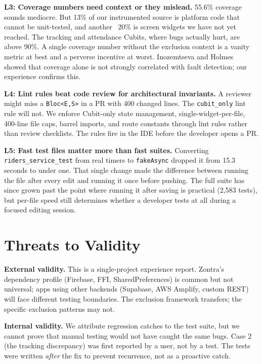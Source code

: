\documentclass[10pt,journal,compsoc]{IEEEtran}
\begin{document}
\textbf{L3: Coverage numbers need context or they mislead.}
55.6\% coverage sounds mediocre. But 13\% of our instrumented source is
platform code that cannot be unit-tested, and another ~20\% is screen
widgets we have not yet reached. The tracking and attendance Cubits,
where bugs actually hurt, are above 90\%. A single coverage number
without the exclusion
context is a vanity metric at best and a perverse incentive at worst.
Inozemtseva and Holmes~\cite{inozemtseva2014coverage} showed that coverage
alone is not strongly correlated with fault detection; our experience
confirms this.

\textbf{L4: Lint rules beat code review for architectural invariants.}
A reviewer might miss a \texttt{Bloc<E,S>} in a PR with 400 changed lines.
The \texttt{cubit\_only} lint rule will not. We enforce Cubit-only state
management, single-widget-per-file, 400-line file caps, barrel imports,
and route constants through lint rules rather than review checklists. The
rules fire in the IDE before the developer opens a PR.

\textbf{L5: Fast test files matter more than fast suites.}
Converting \texttt{riders\_service\_test} from real timers to
\texttt{fakeAsync} dropped it from 15.3 seconds to under one. That
single change made the difference between running the file after every
edit and running it once before pushing. The full suite has since grown
past the point where running it after saving is practical (2,583 tests),
but per-file speed still determines whether a developer tests at all
during a focused editing session.


\section{Threats to Validity}
\label{sec:threats}

\textbf{External validity.} This is a single-project experience report.
Zontra's dependency profile (Firebase, FFI, SharedPreferences) is common
but not universal; apps using other backends (Supabase, AWS Amplify,
custom REST) will face different testing boundaries. The exclusion
framework transfers; the specific exclusion patterns may not.

\textbf{Internal validity.} We attribute regression catches to the test
suite, but we cannot prove that manual testing would not have caught
the same bugs. Case 2 (the tracking discrepancy) was first reported by a
user, not by a test. The tests were written \emph{after} the fix to
prevent recurrence, not as a proactive catch.
\end{document}
